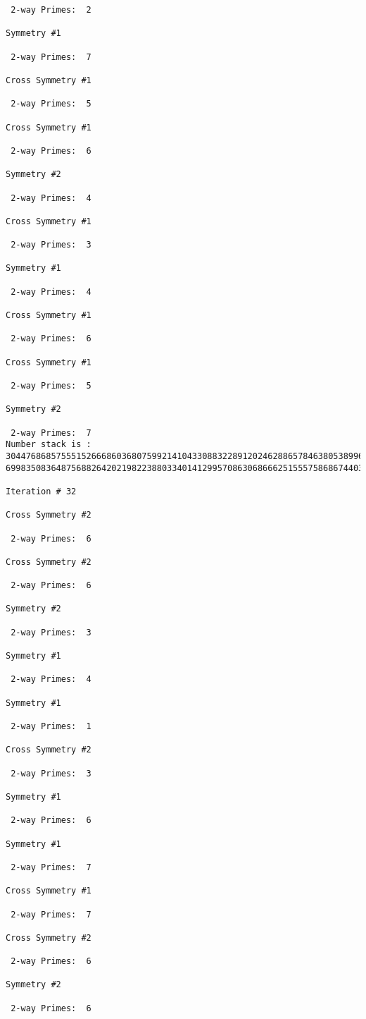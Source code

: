 \begin{verbatim}
 2-way Primes: 	2

Symmetry #1

 2-way Primes: 	7

Cross Symmetry #1

 2-way Primes: 	5

Cross Symmetry #1

 2-way Primes: 	6

Symmetry #2

 2-way Primes: 	4

Cross Symmetry #1

 2-way Primes: 	3

Symmetry #1

 2-way Primes: 	4

Cross Symmetry #1

 2-way Primes: 	6

Cross Symmetry #1

 2-way Primes: 	5

Symmetry #2

 2-way Primes: 	7
Number stack is :
30447686857555152666860368075992141043308832289120246288657846380538996794608835958544046240163340857
69983508364875688264202198223880334014129957086306866625155575868674403758043361042640445859538806497

Iteration #	32

Cross Symmetry #2

 2-way Primes: 	6

Cross Symmetry #2

 2-way Primes: 	6

Symmetry #2

 2-way Primes: 	3

Symmetry #1

 2-way Primes: 	4

Symmetry #1

 2-way Primes: 	1

Cross Symmetry #2

 2-way Primes: 	3

Symmetry #1

 2-way Primes: 	6

Symmetry #1

 2-way Primes: 	7

Cross Symmetry #1

 2-way Primes: 	7

Cross Symmetry #2

 2-way Primes: 	6

Symmetry #2

 2-way Primes: 	6


\end{verbatim}
